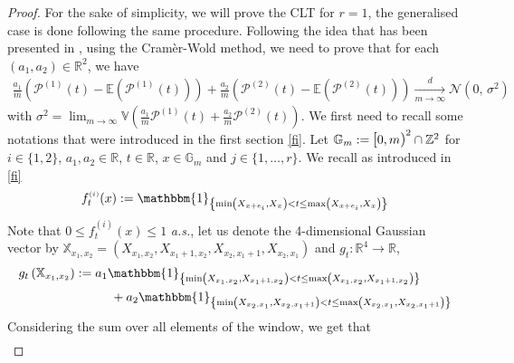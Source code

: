 \documentclass[12pt]{article}
\theoremstyle{Theorem}
\begin{document}
\begin{proof} For the sake of simplicity, we will prove the CLT for $r=1$, the generalised case is done following the same procedure. Following the idea that has been presented in \cite{Psymetrie}, 
using the Cramèr-Wold method, we need to prove that for each $(a_1, a_2) \in \mathbb{R}^{2}$, we have 
\begin{align*}
\frac{a_{1}}{m}\left(\mathcal{P}^{\scriptscriptstyle (1)}(t) - \mathbb{E}\left(\mathcal{P}^{\scriptscriptstyle (1)}(t)\right)\right) + \frac{a_{2}}{m}\left(\mathcal{P}^{\scriptscriptstyle (2)}(t) - \mathbb{E}\left(\mathcal{P}^{\scriptscriptstyle (2)}(t)\right)\right) \xrightarrow[m \to \infty]{d} \mathcal{N}\left(0,\,\sigma^{2}\right) 
\end{align*}
with $\sigma^{2} = \lim_{m \to \infty} \mathbb{V}\left( \frac{a_{1}}{m}\mathcal{P}^{\scriptscriptstyle (1)}(t) + \frac{a_{2}}{m}\mathcal{P}^{\scriptscriptstyle (2)}(t) \right)$.
We first need to recall some notations that were introduced in the first section \eqref{fi}. Let $\mathbb{G}_{m} := \text{\larger[1]{$[$}}0, m \text{\larger[1]{$)$}}^{2} \cap \mathbb{Z}^{2}$  for $i \in \{1,2\}$,  $a_{1}, a_{2} \in \mathbb{R}$, $t \in \mathbb{R}$, $x \in \mathbb{G}_{m}$ and $j \in \{1,\ldots,r\}$.  We recall as introduced in \eqref{fi}
\begin{align*}
f_{t}^{\scriptscriptstyle (i)}(x) := \mathbbm{1}_{\left\{\min\left(X_{x+e_{i}}, X_{\scriptscriptstyle x}\right) < t \leq \max\left(X_{x+e_{i}}, X_{\scriptscriptstyle x}\right)\right\}}
\end{align*}
Note that $0 \leq f_{t}^{\scriptscriptstyle (i)}(x) \leq 1$ \textit{a.s.}, let us denote the 4-dimensional Gaussian vector by $\mathbb{X}_{x_1, x_2} = (X_{x_1, x_2}, X_{x_1 + 1, x_2}, X_{x_2, x_1+1}, X_{x_2, x_1} )$ and $g_{t} : \mathbb{R}^{4} \to \mathbb{R}$, 
\begin{align*}
g_{t}\left(\mathbb{X}_{x_1, x_2}\right) & := a_{1}\mathbbm{1}_{\left\{\min\left(X_{x_1, x_2}, X_{\scriptscriptstyle x_1 +  1, \scriptscriptstyle x_2}\right) < t \leq \max\left(X_{x_1, x_2}, X_{\scriptscriptstyle x_1 +  1, \scriptscriptstyle x_2}\right)\right\}} \\
& \hspace{1cm} + a_{2}\mathbbm{1}_{\left\{\min\left(X_{x_2, x_1}, X_{\scriptscriptstyle x_2, x_1 + 1}\right) < t \leq \max\left(X_{x_2, x_1}, X_{\scriptscriptstyle x_2, x_1 + 1}\right)\right\}}
\end{align*}
Considering the sum over all elements of the window, we get that 
\begin{align*} 

\end{align*}
\end{proof}
\end{document}
